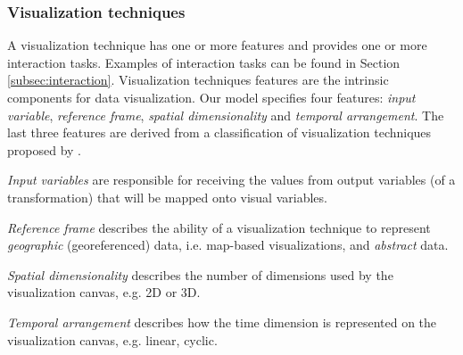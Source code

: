 \documentclass[]{interact}
\theoremstyle{plain}%
\theoremstyle{definition}
\theoremstyle{remark}
\theoremstyle{definition}
\begin{document}
%

%



\subsubsection{Visualization techniques}
\label{sec:vis}

A visualization technique has one or more features and provides one or more interaction tasks. Examples of interaction tasks can be found in Section \ref{subsec:interaction}. Visualization techniques features are the intrinsic components for data visualization. Our model specifies four features: \emph{input variable}, \emph{reference frame}, \emph{spatial dimensionality} and \emph{temporal arrangement}. The last three features are derived from a classification of visualization techniques proposed by \citep{Aigner2011}.

\emph{Input variables} are responsible for receiving the values from output variables (of a transformation) that will be mapped onto visual variables.

\emph{Reference frame} describes the ability of a visualization technique to represent \emph{geographic} (georeferenced) data, i.e. map-based visualizations, and \emph{abstract} data.

\emph{Spatial dimensionality} describes the number of dimensions used by the visualization canvas, e.g. 2D or 3D.

\emph{Temporal arrangement} describes how the time dimension is represented on the visualization canvas, e.g. linear, cyclic.
\end{document}
